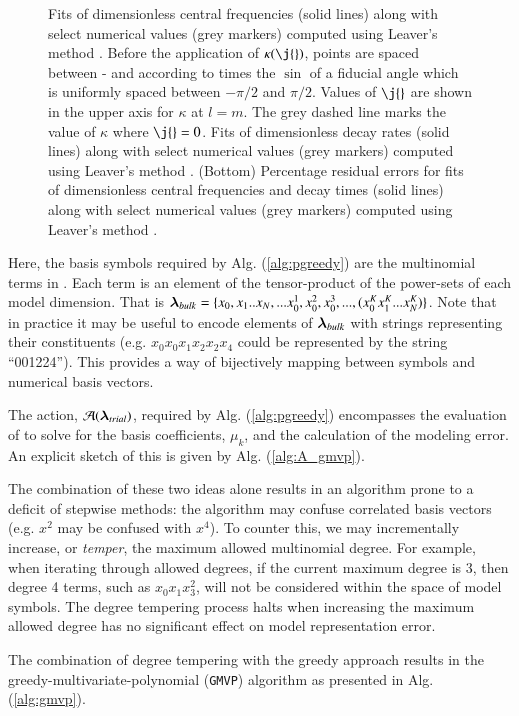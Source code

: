 \documentclass[twocolumn,aps,prd,floatfix,preprintnumbers,a4paper,nofootinbib,
superscriptaddress,10pt]{revtex4-1}
\def\gmvp#1{greedy-multivariate-polynomial#1
  (\texttt{GMVP}#1)\gdef\gmvp{\texttt{GMVP}}}
\def\CwFitCalibrationRegion{\red{0.995} }
\begin{document}
\begin{figure}[htb]
\begin{tabular}{ll}
  \end{tabular}
	\caption{ Fits of dimensionless \qnm{} central frequencies (solid lines) along with select numerical values (grey markers) computed using Leaver's method \cite{Leaver85}.
  Before the application of $\kappa(\j{})$, points are spaced between -\CwFitCalibrationRegion and \CwFitCalibrationRegion according to \CwFitCalibrationRegion times the $\sin$ of a fiducial angle which is uniformly spaced between $-\pi/2$ and $\pi/2$. Values of $\j{}$ are shown in the upper axis for $\kappa$ at $l=m$.
  The grey dashed line marks the value of $\kappa$ where $\j{}=0$. Fits of dimensionless \qnm{} decay rates (solid lines) along with select numerical values (grey markers) computed using Leaver's method \cite{Leaver85}. (Bottom) Percentage residual errors for fits of dimensionless \qnm{} central frequencies and decay times (solid lines) along with select numerical values (grey markers) computed using Leaver's method \cite{Leaver85}. }
  \label{fig:qnm}
\end{figure}
%
\par Here, the basis symbols required by Alg. (\ref{alg:pgreedy}) are the multinomial terms in .
%
Each term is an element of the tensor-product of the power-sets of each model dimension. That is ${\bm{\lambda}}_{bulk} = \{x_0,x_1 .. x_N, ... x_0^1, x_0^2, x_0^3, ...  , (x_0^K x_1^K ... x_N^K) \}$.
%
Note that in practice it may be useful to encode elements of ${\bm{\lambda}}_{bulk}$ with strings representing their constituents (e.g. $x_0 x_0 x_1 x_2 x_2 x_4$ could be represented by the string ``001224''). This provides a way of bijectively mapping between symbols and numerical basis vectors.
%
\par The action, $\mathcal{A}({\bm{\lambda}}_{trial})$, required by Alg. (\ref{alg:pgreedy}) encompasses the evaluation of  to solve for the basis coefficients, $\mu_k$, and the calculation of the modeling error.
%
An explicit sketch of this is given by Alg. (\ref{alg:A_gmvp}).
%
\par The combination of these two ideas alone results in an algorithm prone to a deficit of stepwise methods: the algorithm may confuse correlated basis vectors (e.g. $x^2$ may be confused with $x^4$).
%
To counter this, we may incrementally increase, or \textit{temper}, the maximum allowed multinomial degree.
%
For example, when iterating through allowed degrees, if the current maximum degree is 3, then degree 4 terms, such as $x_0x_1x_3^2$, will not be considered within the space of model symbols.
%
The degree tempering process halts when increasing the maximum allowed degree has no significant effect on model representation error.
%
\par The combination of degree tempering with the greedy approach results in the \gmvp{} algorithm as presented in Alg. (\ref{alg:gmvp}).
%
%
\end{document}
